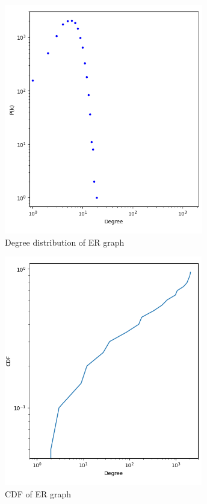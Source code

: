 \documentclass[sigchi]{acmart}
\begin{document}
\begin{figure}[hbpt]
  \centering
  \includegraphics[width=0.8\linewidth]{img/degree_distribution_ER.png}
  \caption{Degree distribution of ER graph}
  \label{fig:degree_distribution_ER}
\end{figure}

\begin{figure}[hbpt]
  \centering
  \includegraphics[width=0.8\linewidth]{img/CDF_ER.png}
  \caption{CDF of ER graph}
  \label{fig:CDF_ER}
\end{figure}
\end{document}
